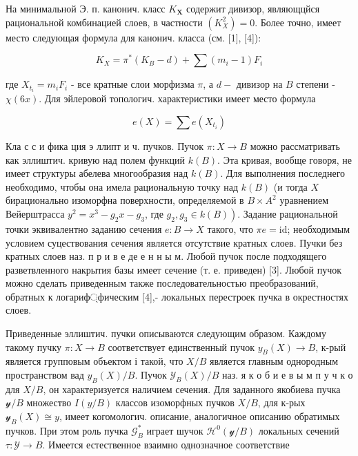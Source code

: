 \documentclass[10pt]{article}
\begin{document}
На минимальной Э. п. канонич. класс $K_{\boldsymbol{X}}$ содержит дивизор, являющцйся рациональной комбинацией слоев, в частности $\left(K_{X}^{2}\right)=0$. Более точно, имеет место следующая формула для канонич. класса (см. [1], [4]):



\[

K_{X}=\pi^{*}\left(K_{B}-d\right)+\sum\left(m_{i}-1\right) F_{i}

\]



где $X_{t_{i}}=m_{i} F_{i}$ - все кратные слои морфизма $\pi$, а $d-$ дивизор на $B$ степени - $\chi(6 x)$. Для эйлеровой топологич. характеристики имеет место формула



\[

e(X)=\sum e\left(X_{t_{i}}\right)

\]



Кла с с и фика ция э ллипт и ч. пучков. Пучок $\pi: X \rightarrow B$ можно рассматривать как эллиштич. кривую над полем функций $k(B)$. Эта кривая, вообще говоря, не имеет структуры абелева многообразия над $k(B)$. Для выполнения последнего необходимо, чтобы она имела рациональную точку над $k(B)$ (и тогда $X$ бирационально изоморфна поверхности, определяемой в $B \times A^{2}$ уравнением Вейерштрасса $y^{2}=x^{3}-g_{2} x-g_{3}$, где $\left.g_{2}, g_{3} \in k(B)\right)$. Задание рациональной точки эквивалентно заданию сечения $e: B \rightarrow X$ такого, что $\pi e=\mathrm{id}$; необходимым условием суцествования сечения является отсутствие кратных слоев. Пучки без кратных слоев наз. п р и в е де е н н ы м. Любой пучок после подходящего разветвленного накрытия базы имеет сечение (т. е. приведен) [3]. Любой пучок можно сделать приведенным также последовательностью преобразований, обратных к логариф্фическим [4],- локальных перестроек пучка в окрестностях слоев.



Приведенные эллиштич. пучки описываются следующим образом. Каждому такому пучку $\pi: X \longrightarrow B$ соответствует единственный пучок $y_{B}(X) \longrightarrow B$, к-рый является групповым объектом і такой, что $X / B$ является главным однородным пространством вад $y_{B}(X) / B$. Пучок $\mathcal{Y}_{B}(X) / B$ наз. я к о б и е в ы м п у ч к о для $X / B$, он характеризуется наличием сечения. Для заданного якобиева пучка $\mathscr{y} / B$ множество $I(y / B)$ классов изоморфных пучков $X / B$, для к-рых $\mathcal{y}_{B}(X) \cong y$, имеет когомологич. описание, аналогичное описанию обратимых пучков. При этом роль пучка $\mathcal{G}_{B}^{*}$ играет шучок $\mathscr{H}^{0}(\mathcal{y} / B)$ локальных сечений $\tau: \mathcal{Y} \longrightarrow B$. Имеется естественное взаимно однозначное соответствие
\end{document}
